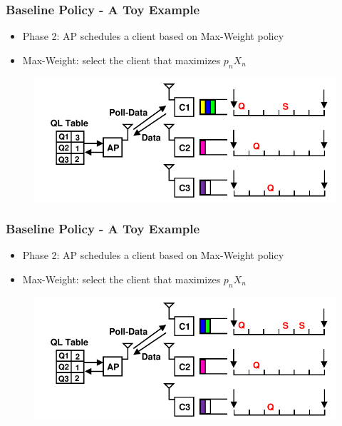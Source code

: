 \documentclass{beamer}
\begin{document}
\begin{frame}
\frametitle{Baseline Policy - A Toy Example}
\begin{itemize}
\item Phase 2: AP schedules a client based on Max-Weight policy
\item Max-Weight: select the client that maximizes $p_nX_n$
\end{itemize}
\begin{figure}
\centering
\includegraphics[scale=0.8]{animation_04.pdf}
\end{figure}
\end{frame}

\begin{frame}
\frametitle{Baseline Policy - A Toy Example}
\begin{itemize}
\item Phase 2: AP schedules a client based on Max-Weight policy
\item Max-Weight: select the client that maximizes $p_nX_n$
\end{itemize}
\begin{figure}
\centering
\includegraphics[scale=0.8]{animation_05.pdf}
\end{figure}
\end{frame}
\end{document}
